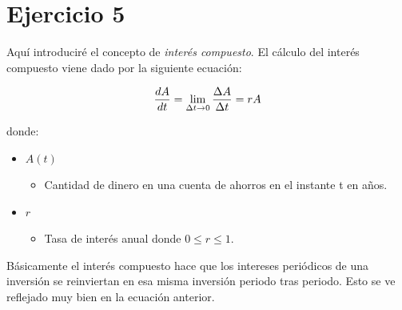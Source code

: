 \documentclass[12pt]{article}
\begin{document}
\section{Ejercicio 5}
Aquí introduciré el concepto de \emph{interés compuesto}. El cálculo del interés compuesto viene dado
por la siguiente ecuación:

\begin{equation*}
    {dA \over dt} = \lim_{\Delta t \rightarrow 0} { {\Delta A} \over {\Delta t} } = r A
\end{equation*}

donde:

\begin{itemize}
    \item $A(t)$
    \begin{itemize}
        \item Cantidad de dinero en una cuenta de ahorros en el instante t en años.
    \end{itemize}
    \item $r$
    \begin{itemize}
        \item Tasa de interés anual donde $0 \leq r \leq 1$.
    \end{itemize}
\end{itemize}

Básicamente el interés compuesto hace que los intereses periódicos de una inversión se reinviertan
en esa misma inversión periodo tras periodo. Esto se ve reflejado muy bien en la ecuación anterior.
\end{document}
